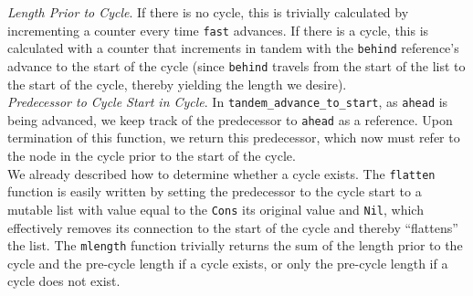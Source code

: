 \documentclass[paper=a4, fontsize=11pt]{scrartcl}
\begin{document}
\textit{Length Prior to Cycle}. If there is no cycle, this is trivially calculated by incrementing a counter every time \texttt{fast} advances. If there is a cycle, this is calculated with a counter that increments in tandem with the \texttt{behind} reference's advance to the start of the cycle (since \texttt{behind} travels from the start of the list to the start of the cycle, thereby yielding the length we desire).\\

\textit{Predecessor to Cycle Start in Cycle}. In \texttt{tandem\_advance\_to\_start}, as \texttt{ahead} is being advanced, we keep track of the predecessor to \texttt{ahead} as a reference. Upon termination of this function, we return this predecessor, which now must refer to the node in the cycle prior to the start of the cycle. \\

We already described how to determine whether a cycle exists. The \texttt{flatten} function is easily written by setting the predecessor to the cycle start to a mutable list with value equal to the \texttt{Cons} its original value and \texttt{Nil}, which effectively removes its connection to the start of the cycle and thereby ``flattens'' the list. The \texttt{mlength} function trivially returns the sum of the length prior to the cycle and the pre-cycle length if a cycle exists, or only the pre-cycle length if a cycle does not exist. 
\end{document}
